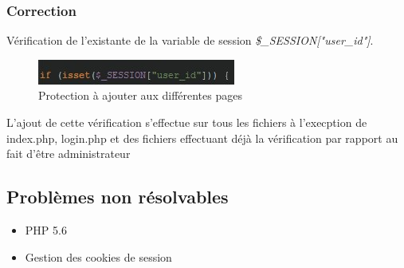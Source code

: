 \documentclass[12pt]{article}
\begin{document}
\subsubsection{Correction}
Vérification de l'existante de la variable de session \textit{\$\_SESSION["user\_id"]}.
\begin{figure}[H]
\centering
\includegraphics{images/protectionPage.jpg}
\caption{Protection à ajouter aux différentes pages}
\end{figure}
L'ajout de cette vérification s'effectue sur tous les fichiers à l'execption de index.php, login.php et des fichiers effectuant déjà la vérification par rapport au fait d'être administrateur


\subsection{Problèmes non résolvables}
\begin{itemize}
\item PHP 5.6
\item Gestion des cookies de session
\end{itemize}
\end{document}
